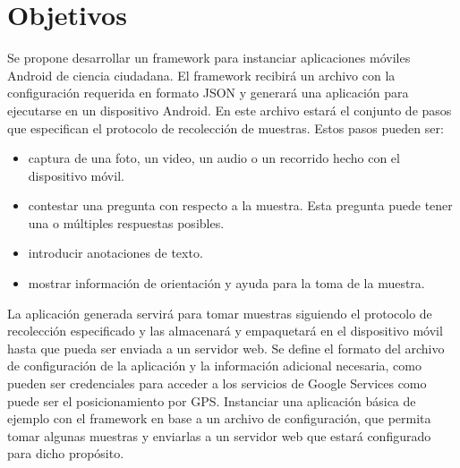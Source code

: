 \section{ Objetivos }		
		
			Se propone desarrollar un framework para instanciar aplicaciones móviles Android de ciencia ciudadana. El framework recibirá un archivo con la configuración requerida en formato JSON y generará una aplicación para ejecutarse en un dispositivo Android. En este archivo estará el conjunto de pasos que especifican el protocolo de recolección de muestras. Estos pasos pueden ser:
			\begin{itemize}
				\item captura de una foto, un video, un audio o un recorrido hecho con el dispositivo móvil.
				\item contestar una pregunta con respecto a la muestra. Esta pregunta puede tener una o múltiples respuestas posibles.
				\item introducir anotaciones de texto.
				\item mostrar información de orientación y ayuda para la toma de la muestra.
			\end{itemize}
		La aplicación generada servirá para tomar muestras siguiendo el protocolo de recolección especificado y las almacenará y empaquetará en el dispositivo móvil hasta que pueda ser enviada a un servidor web.
		Se define el formato del archivo de configuración de la aplicación y la información adicional necesaria, como pueden ser credenciales para acceder a los servicios de Google Services como puede ser el posicionamiento por GPS.
		Instanciar una aplicación básica de ejemplo con el framework en base a un archivo de configuración, que permita tomar algunas muestras y enviarlas a un servidor web que estará configurado para dicho propósito.
			